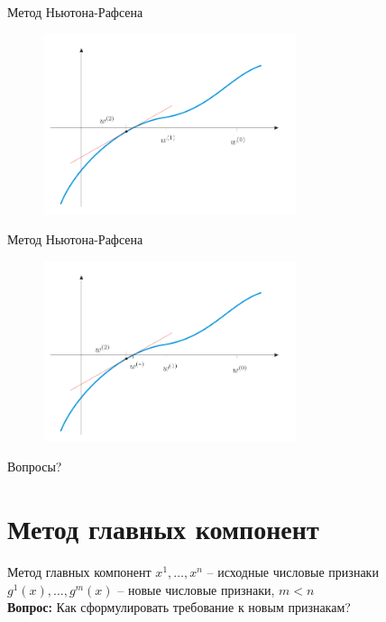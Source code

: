 \documentclass[10pt]{beamer}
\begin{document}
\begin{frame}{Метод Ньютона-Рафсена}
	\begin{figure}[htbp]
	  \includegraphics[height=150pt, keepaspectratio = true]{images/newton-15}   
	\end{figure}
\end{frame}

\begin{frame}{Метод Ньютона-Рафсена}
	\begin{figure}[htbp]
	  \includegraphics[height=150pt, keepaspectratio = true]{images/newton-16}   
	\end{figure}
\end{frame}

\begin{frame}[standout]
  Вопросы?
\end{frame}

\appendix

\section{Метод главных компонент}

\begin{frame}{Метод главных компонент}
	$x^1, \dots, x^n$ -- исходные числовые признаки\\
	$g^1(x), \dots, g^m(x)$ -- новые числовые признаки, $m < n$\\
	\bigbreak
	\textbf{Вопрос:} Как сформулировать требование к новым признакам?
\end{frame}
\end{document}

